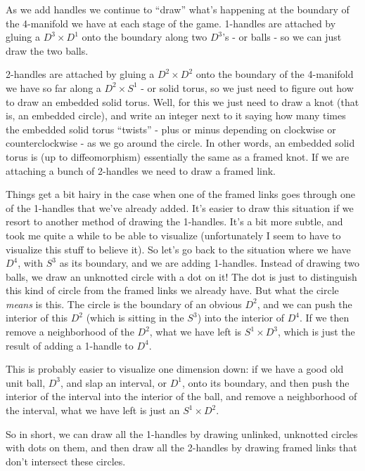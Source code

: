 \documentclass{article}
\begin{document}
As we add handles we continue to ``draw'' what's happening at the
boundary of the 4-manifold we have at each stage of the game. 1-handles
are attached by gluing a \(D^3 \times D^1\) onto the boundary along two
\(D^3\)'s - or balls - so we can just draw the two balls.

2-handles are attached by gluing a \(D^2 \times D^2\) onto the boundary
of the 4-manifold we have so far along a \(D^2 \times S^1\) - or solid
torus, so we just need to figure out how to draw an embedded solid
torus. Well, for this we just need to draw a knot (that is, an embedded
circle), and write an integer next to it saying how many times the
embedded solid torus ``twists'' - plus or minus depending on clockwise
or counterclockwise - as we go around the circle. In other words, an
embedded solid torus is (up to diffeomorphism) essentially the same as a
framed knot. If we are attaching a bunch of 2-handles we need to draw a
framed link.

Things get a bit hairy in the case when one of the framed links goes
through one of the 1-handles that we've already added. It's easier to
draw this situation if we resort to another method of drawing the
1-handles. It's a bit more subtle, and took me quite a while to be able
to visualize (unfortunately I seem to have to visualize this stuff to
believe it). So let's go back to the situation where we have \(D^4\),
with \(S^3\) as its boundary, and we are adding 1-handles. Instead of
drawing two balls, we draw an unknotted circle with a dot on it! The dot
is just to distinguish this kind of circle from the framed links we
already have. But what the circle \emph{means} is this. The circle is
the boundary of an obvious \(D^2\), and we can push the interior of this
\(D^2\) (which is sitting in the \(S^3\)) into the interior of \(D^4\).
If we then remove a neighborhood of the \(D^2\), what we have left is
\(S^1 \times D^3\), which is just the result of adding a 1-handle to
\(D^4\).

This is probably easier to visualize one dimension down: if we have a
good old unit ball, \(D^3\), and slap an interval, or \(D^1\), onto its
boundary, and then push the interior of the interval into the interior
of the ball, and remove a neighborhood of the interval, what we have
left is just an \(S^1 \times D^2\).

So in short, we can draw all the 1-handles by drawing unlinked,
unknotted circles with dots on them, and then draw all the 2-handles by
drawing framed links that don't intersect these circles.
\end{document}
